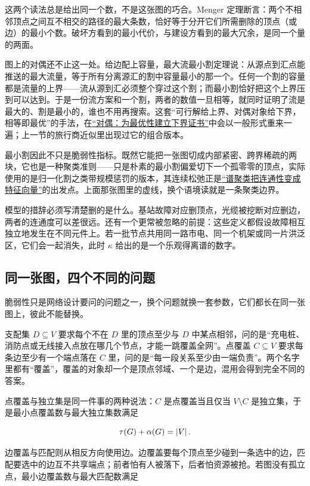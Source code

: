 这两个读法总是给出同一个数，不是这张图的巧合。Menger 定理断言：两个不相邻顶点之间互不相交的路径的最大条数，恰好等于分开它们所需删除的顶点（或边）的最小个数。破坏方看到的最小代价，与建设方看到的最大冗余，是同一个量的两面。

图上的对偶还不止这一处。给边配上容量，最大流最小割定理说：从源点到汇点能推送的最大流量，等于所有分离源汇的割中容量最小的那一个。任何一个割的容量都是流量的上界——流从源到汇必须整个穿过这个割；而最小割恰好把这个上界压到可以达到。于是一份流方案和一个割，两者的数值一旦相等，就同时证明了流是最大的、割是最小的，谁也不用再搜索。这套``可行解给上界、对偶对象给下界，相等即最优''的手法，在\hyperref[ch:075]{``对偶：为最优性建立下界证书''}中会以一般形式重来一遍；上一节的旅行商近似里出现过它的组合版本。

最小割因此不只是脆弱性指标。既然它能把一张图切成内部紧密、跨界稀疏的两块，它也是一种聚类准则——只是朴素的最小割偏爱切下一个孤零零的顶点，实际使用的是归一化割之类带规模惩罚的版本，其连续松弛正是\hyperref[sec:13-Machine-Learning/05-Clustering-and-Data-Geometry/02]{``谱聚类把连通性变成特征向量''}的出发点。上面那张图里的虚线，换个语境读就是一条聚类边界。

模型的措辞必须写清楚删的是什么。基站故障对应删顶点，光缆被挖断对应删边，两者的连通度可以差很远。还有一个更常被忽略的前提：这些定义都假设故障相互独立地发生在不同元件上。若一批节点共用同一路市电、同一个机架或同一片洪泛区，它们会一起消失，此时 \(\kappa\) 给出的是一个乐观得离谱的数字。

\subsection{同一张图，四个不同的问题}

脆弱性只是网络设计要问的问题之一，换个问题就换一套参数，它们都长在同一张图上，彼此不能替换。

支配集 \(D\subseteq V\) 要求每个不在 \(D\) 里的顶点至少与 \(D\) 中某点相邻，问的是``充电桩、消防点或无线接入点放在哪几个节点，才能一跳覆盖全网''。点覆盖 \(C\subseteq V\) 要求每条边至少有一个端点落在 \(C\) 里，问的是``每一段关系至少由一端负责''。两个名字里都有``覆盖''，覆盖的对象却一个是顶点邻域、一个是边，混用会得到完全不同的答案。

点覆盖与独立集是同一件事的两种说法：\(C\) 是点覆盖当且仅当 \(V\setminus C\) 是独立集，于是最小点覆盖数与最大独立集数满足

\[
\tau(G)+\alpha(G)=\left|V\right|.
\]

边覆盖与匹配则从相反方向使用边。边覆盖要每个顶点至少碰到一条选中的边，匹配要选中的边互不共享端点；前者怕有人被落下，后者怕资源被抢。若图没有孤立点，最小边覆盖数与最大匹配数满足

